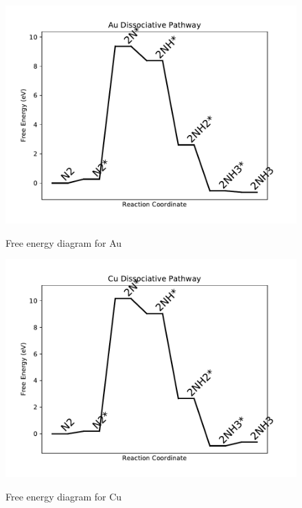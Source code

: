 \documentclass{article}
\begin{document}
\newpage
\begin{figure}
\includegraphics[width=1\linewidth]{data/plots/Au_dissociative.pdf}
\label{fig:Au_dissociative}
\caption{Free energy diagram for Au}
\end{figure}

\begin{figure}
\includegraphics[width=1\linewidth]{data/plots/Cu_dissociative.pdf}
\label{fig:Cu_dissociative}
\caption{Free energy diagram for Cu}
\end{figure}
\end{document}
